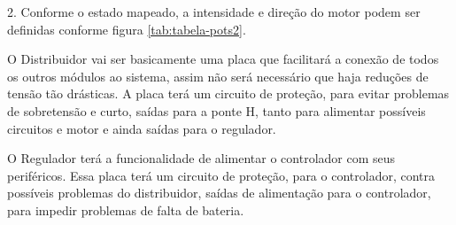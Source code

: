 2. Conforme o estado mapeado, a intensidade e direção do motor podem ser definidas conforme figura \ref{tab:tabela-pots2}.

\begin{table}[!ht]
\centering
{}
\caption{Intesidade e direção dos motores conforme estado. Asteriscos simbolizam motor sem direção}
\label{tab:tabela-pots2}
\end{table}

O Distribuidor vai ser basicamente uma placa que facilitará a conexão de todos os outros módulos ao sistema, assim não será necessário que haja reduções de tensão tão drásticas. A placa terá um circuito de proteção, para evitar problemas de sobretensão e curto, saídas para a ponte H, tanto para alimentar possíveis circuitos e motor e ainda saídas para o regulador.

O Regulador terá a funcionalidade de alimentar o controlador com seus periféricos. Essa placa terá um circuito de proteção, para o controlador, contra possíveis problemas do distribuidor, saídas de alimentação para o controlador, para impedir problemas de falta de bateria.

